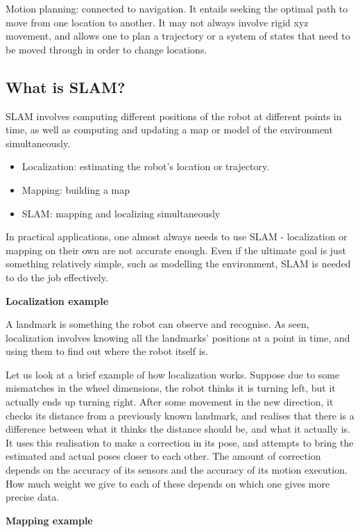 \documentclass[a4paper]{article}
\begin{document}
Motion planning: connected to navigation. It entails seeking the optimal path to move from one location to another. It may not always involve rigid xyz movement, and allows one to plan a trajectory or a system of states that need to be moved through in order to change locations.

\subsection{What is SLAM?}

SLAM involves computing different positions of the robot at different points in time, as well as computing and updating a map or model of the environment simultaneously.

\begin{itemize}
    \item Localization: estimating the robot's location or trajectory. 
    \item Mapping: building a map
    \item SLAM: mapping and localizing simultaneously
\end{itemize}

In practical applications, one almost always needs to use SLAM - localization or mapping on their own are not accurate enough. Even if the ultimate goal is just something relatively simple, such as modelling the environment, SLAM is needed to do the job effectively.

\textbf{Localization example}

A landmark is something the robot can observe and recognise. As seen, localization involves knowing all the landmarks' positions at a point in time, and using them to find out where the robot itself is.

Let us look at a brief example of how localization works. Suppose due to some mismatches in the wheel dimensions, the robot thinks it is turning left, but it actually ends up turning right. After some movement in the new direction, it checks its distance from a previously known landmark, and realises that there is a difference between what it thinks the distance should be, and what it actually is. It uses this realisation to make a correction in its pose, and attempts to bring the estimated and actual poses closer to each other. The amount of correction depends on the accuracy of its sensors and the accuracy of its motion execution. How much weight we give to each of these depends on which one gives more precise data.

\textbf{Mapping example}
\end{document}
